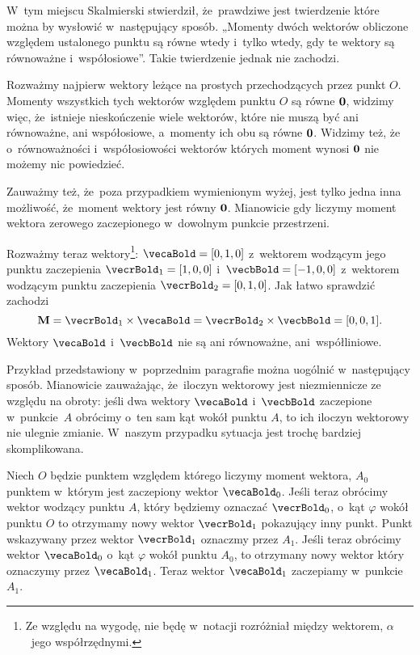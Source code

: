 \documentclass[a4paper,11pt]{article}
\numberwithin{equation}{section}
\begin{document}
\VerSpaceFour





\noindent
{} W~tym miejscu Skalmierski stwierdził, że~prawdziwe jest twierdzenie
które można by wysłowić w~następujący sposób. „Momenty dwóch wektorów
obliczone względem ustalonego punktu są równe wtedy i~tylko wtedy, gdy te
wektory są równoważne i~współosiowe”. Takie twierdzenie jednak nie zachodzi.

Rozważmy najpierw wektory leżące na prostych przechodzących przez punkt
$O$. Momenty wszystkich tych wektorów względem punktu $O$ są równe
$\mathbf{0}$, widzimy więc, że~istnieje nieskończenie wiele wektorów,
które nie muszą być ani równoważne, ani współosiowe, a~momenty ich obu są
równe $\mathbf{0}$. Widzimy też, że o~równoważności i~współosiowości
wektorów których moment wynosi $\mathbf{0}$ nie możemy nic powiedzieć.

Zauważmy też, że~poza przypadkiem wymienionym wyżej, jest tylko jedna inna
możliwość, że~moment wektory jest równy $\mathbf{0}$. Mianowicie gdy
liczymy moment wektora zerowego zaczepionego w~dowolnym punkcie
przestrzeni.

Rozważmy teraz wektory\footnote{Ze względu na wygodę, nie będę w~notacji
  rozróżniał między wektorem, $\alpha$~jego współrzędnymi.}:
$\vecaBold = [ 0, 1, 0 ]$ z~wektorem wodzącym jego punktu zaczepienia
$\vecrBold_{ 1 } = [ 1, 0, 0 ]$ i~$\vecbBold = [ -1, 0,  0 ]$ z~wektorem
wodzącym punktu zaczepienia $\vecrBold_{ 2 } = [ 0, 1, 0 ]$. Jak łatwo
sprawdzić zachodzi
\begin{equation}
  \label{eq:SkalmierskiMechanika-07}
  \vecMbold = \vecrBold_{ 1 } \times \vecaBold =
  \vecrBold_{ 2 } \times \vecbBold = [ 0, 0, 1 ].
\end{equation}
Wektory $\vecaBold$ i~$\vecbBold$ nie są ani równoważne, ani~współliniowe.

Przykład przedstawiony w~poprzednim paragrafie można uogólnić w~następujący
sposób. Mianowicie zauważając, że~iloczyn wektorowy jest niezmiennicze ze
względu na obroty: jeśli dwa wektory $\vecaBold$ i~$\vecbBold$ zaczepione
w~punkcie~$A$ obrócimy o~ten sam kąt wokół punktu $A$, to ich iloczyn
wektorowy nie ulegnie zmianie. W~naszym przypadku sytuacja jest trochę
bardziej skomplikowana.

Niech $O$ będzie punktem względem którego liczymy moment wektora, $A_{ 0 }$
punktem w~którym jest zaczepiony wektor $\vecaBold_{ 0 }$. Jeśli teraz
obrócimy wektor wodzący punktu $A$, który będziemy oznaczać
$\vecrBold_{ 0 }$, o~kąt $\varphi$ wokół punktu $O$ to otrzymamy nowy wektor
$\vecrBold_{ 1 }$ pokazujący inny punkt. Punkt wskazywany przez wektor
$\vecrBold_{ 1 }$ oznaczmy przez $A_{ 1 }$. Jeśli teraz obrócimy wektor
$\vecaBold_{ 0 }$ o~kąt $\varphi$ wokół punktu $A_{ 0 }$, to otrzymany nowy wektor
który oznaczymy przez $\vecaBold_{ 1 }$. Teraz wektor $\vecaBold_{ 1 }$
zaczepiamy w~punkcie $A_{ 1 }$.
\end{document}
